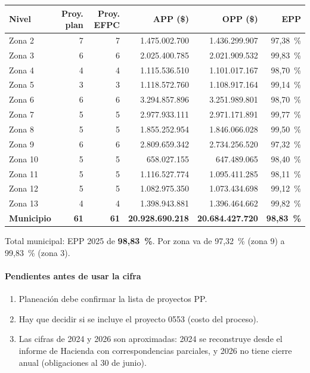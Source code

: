 \documentclass[11pt,letterpaper]{article}
\begin{document}
\begin{center}\footnotesize\begin{tabular}{lrrrrr}\toprule

\textbf{Nivel} & \textbf{Proy. plan} & \textbf{Proy. EFPC} & \textbf{APP (\$)} & \textbf{OPP (\$)} & \textbf{EPP} \\ \midrule

Zona 2 & 7 & 7 & 1.475.002.700 & 1.436.299.907 & 97,38~\% \\
Zona 3 & 6 & 6 & 2.025.400.785 & 2.021.909.532 & 99,83~\% \\
Zona 4 & 4 & 4 & 1.115.536.510 & 1.101.017.167 & 98,70~\% \\
Zona 5 & 3 & 3 & 1.118.572.760 & 1.108.917.164 & 99,14~\% \\
Zona 6 & 6 & 6 & 3.294.857.896 & 3.251.989.801 & 98,70~\% \\
Zona 7 & 5 & 5 & 2.977.933.111 & 2.971.171.891 & 99,77~\% \\
Zona 8 & 5 & 5 & 1.855.252.954 & 1.846.066.028 & 99,50~\% \\
Zona 9 & 6 & 6 & 2.809.659.342 & 2.734.256.520 & 97,32~\% \\
Zona 10 & 5 & 5 & 658.027.155 & 647.489.065 & 98,40~\% \\
Zona 11 & 5 & 5 & 1.116.527.774 & 1.095.411.285 & 98,11~\% \\
Zona 12 & 5 & 5 & 1.082.975.350 & 1.073.434.698 & 99,12~\% \\
Zona 13 & 4 & 4 & 1.398.943.881 & 1.396.464.662 & 99,82~\% \\ \midrule

\textbf{Municipio} & \textbf{61} & \textbf{61} & \textbf{20.928.690.218} & \textbf{20.684.427.720} & \textbf{98,83~\%} \\ \bottomrule\end{tabular}\end{center}

Total municipal: EPP 2025 de \textbf{98,83~\%}. Por zona va de 97,32~\% (zona 9) a 99,83~\% (zona 3).

\paragraph{Pendientes antes de usar la cifra}

\begin{enumerate}
\item Planeación debe confirmar la lista de proyectos PP.
\item Hay que decidir si se incluye el proyecto 0553 (costo del proceso).
\item Las cifras de 2024 y 2026 son aproximadas: 2024 se reconstruye desde el informe de Hacienda con correspondencias parciales, y 2026 no tiene cierre anual (obligaciones al 30 de junio).
\end{enumerate}
\end{document}
